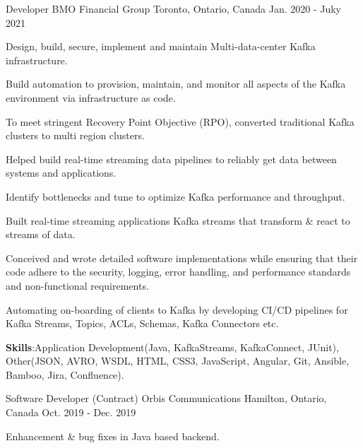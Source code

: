 \begin{cventries}
  \cventry
    {Developer} %
    {BMO Financial Group} %
    {Toronto, Ontario, Canada} %
    {Jan. 2020 - Juky 2021} %
    {
      \begin{cvitems} %
        \item {Design, build, secure, implement and maintain Multi-data-center Kafka infrastructure.}
        \item {Build automation to provision, maintain, and monitor all aspects of the Kafka environment via infrastructure as code.}
        \item To meet stringent Recovery Point Objective (RPO), converted traditional Kafka clusters to multi region clusters. 
        \item {Helped build real-time streaming data pipelines to reliably get data between systems and applications.}
        \item {Identify bottlenecks and tune to optimize Kafka performance and throughput.}
        \item {Built real-time streaming applications Kafka streams that transform \& react to streams of data.}
        \item {Conceived and wrote detailed software implementations while ensuring that their code adhere to the security, logging, error handling, and performance standards and non-functional requirements.}
        \item {Automating on-boarding of clients to Kafka by developing CI/CD pipelines for Kafka Streams, Topics, ACLs, Schemas, Kafka Connectors etc.}
         \vspace{1mm} %
        \item {\textbf{Skills}:Application Development(Java, KafkaStreams, KafkaConnect, JUnit), Other(JSON, AVRO, WSDL, HTML, CSS3, JavaScript, Angular, Git, Ansible, Bamboo, Jira, Confluence).}
      \end{cvitems}
    }
    \vspace{5mm} %
  \cventry
    {Software Developer (Contract)} %
    {Orbis Communications} %
    {Hamilton, Ontario, Canada} %
    {Oct. 2019 - Dec. 2019} %
    {
      \begin{cvitems} %
        \item {Enhancement \& bug fixes in Java based backend.}

\end{cvitems}}
\end{cventries}
